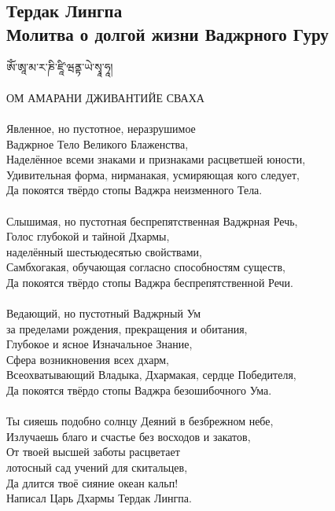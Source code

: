 \subsection{Тердак Лингпа\\Молитва о долгой жизни Ваджрного Гуру}
\ti
ཨོཾ་ཨཱ་མ་ར་ཎི་ཛཱི་ཝནྟ་ཡེ་སྭཱ་ཧཱ།\\
\\
\ru ОМ АМАРАНИ ДЖИВАНТИЙЕ СВАХА\\
\\
Явленное, но пустотное, неразрушимое \\ \indent Ваджрное Тело Великого Блаженства,\\
Наделённое всеми знаками и признаками расцветшей юности,\\
Удивительная форма, нирманакая, усмиряющая кого следует,\\
Да покоятся твёрдо стопы Ваджра неизменного Тела.\\
\\
Слышимая, но пустотная беспрепятственная Ваджрная Речь,\\
Голос глубокой и тайной Дхармы, \\ \indent наделённый шестьюдесятью свойствами,\\
Самбхогакая, обучающая согласно способностям существ,\\
Да покоятся твёрдо стопы Ваджра беспрепятственной Речи.\\
\\
Ведающий, но пустотный Ваджрный Ум \\ \indent за пределами рождения, прекращения и обитания,\\
Глубокое и ясное Изначальное Знание, \\ \indent Сфера возникновения всех дхарм,\\
Всеохватывающий Владыка, Дхармакая, сердце Победителя,\\
Да покоятся твёрдо стопы Ваджра безошибочного Ума.\\
\\
Ты сияешь подобно солнцу Деяний в безбрежном небе,\\
Излучаешь благо и счастье без восходов и закатов,\\
От твоей высшей заботы расцветает \\ \indent лотосный сад учений для скитальцев,\\
Да длится твоё сияние океан кальп!\\
\scriptsize
Написал Царь Дхармы Тердак Лингпа.
\normalsize
\newpage

